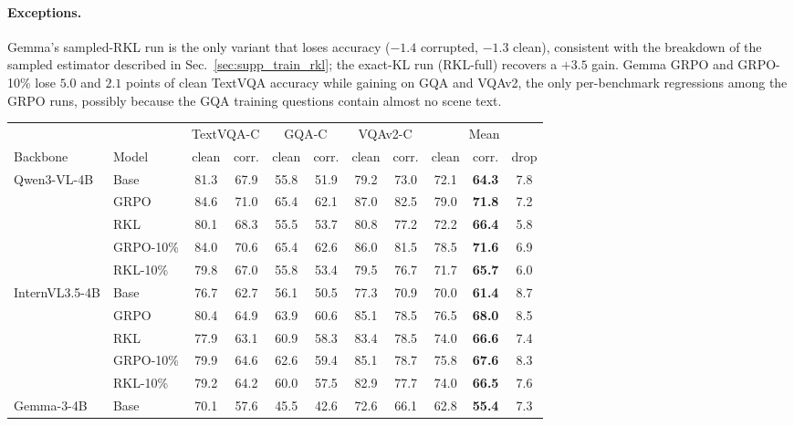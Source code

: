 \paragraph{Exceptions.}
Gemma's sampled-RKL run is the only variant that loses accuracy ($-1.4$ corrupted,
$-1.3$ clean), consistent with the breakdown of the sampled estimator described in
Sec.~\ref{sec:supp_train_rkl}; the exact-KL run (RKL-full) recovers a $+3.5$ gain. Gemma GRPO
and GRPO-10\% lose $5.0$ and $2.1$ points of clean TextVQA accuracy while gaining on GQA and
VQAv2, the only per-benchmark regressions among the GRPO runs, possibly because the GQA
training questions contain almost no scene text.

\begin{table}[t]
\centering\small
\setlength{\tabcolsep}{4pt}
\begin{tabular}{llcccccc|ccc}
\toprule
& & \multicolumn{2}{c}{TextVQA-C} & \multicolumn{2}{c}{GQA-C} & \multicolumn{2}{c|}{VQAv2-C} & \multicolumn{3}{c}{Mean} \\
\cmidrule(lr){3-4}\cmidrule(lr){5-6}\cmidrule(lr){7-8}\cmidrule(lr){9-11}
Backbone & Model & clean & corr. & clean & corr. & clean & corr. & clean & corr. & drop \\
\midrule
\multirow{5}{*}{Qwen3-VL-4B} & Base & 81.3 & 67.9 & 55.8 & 51.9 & 79.2 & 73.0 & 72.1 & \textbf{64.3} & 7.8 \\
 & GRPO & 84.6 & 71.0 & 65.4 & 62.1 & 87.0 & 82.5 & 79.0 & \textbf{71.8} & 7.2 \\
 & RKL & 80.1 & 68.3 & 55.5 & 53.7 & 80.8 & 77.2 & 72.2 & \textbf{66.4} & 5.8 \\
 & GRPO-10\% & 84.0 & 70.6 & 65.4 & 62.6 & 86.0 & 81.5 & 78.5 & \textbf{71.6} & 6.9 \\
 & RKL-10\% & 79.8 & 67.0 & 55.8 & 53.4 & 79.5 & 76.7 & 71.7 & \textbf{65.7} & 6.0 \\
\midrule
\multirow{5}{*}{InternVL3.5-4B} & Base & 76.7 & 62.7 & 56.1 & 50.5 & 77.3 & 70.9 & 70.0 & \textbf{61.4} & 8.7 \\
 & GRPO & 80.4 & 64.9 & 63.9 & 60.6 & 85.1 & 78.5 & 76.5 & \textbf{68.0} & 8.5 \\
 & RKL & 77.9 & 63.1 & 60.9 & 58.3 & 83.4 & 78.5 & 74.0 & \textbf{66.6} & 7.4 \\
 & GRPO-10\% & 79.9 & 64.6 & 62.6 & 59.4 & 85.1 & 78.7 & 75.8 & \textbf{67.6} & 8.3 \\
 & RKL-10\% & 79.2 & 64.2 & 60.0 & 57.5 & 82.9 & 77.7 & 74.0 & \textbf{66.5} & 7.6 \\
\midrule
\multirow{6}{*}{Gemma-3-4B} & Base & 70.1 & 57.6 & 45.5 & 42.6 & 72.6 & 66.1 & 62.8 & \textbf{55.4} & 7.3 \\

\end{tabular}
\end{table}
